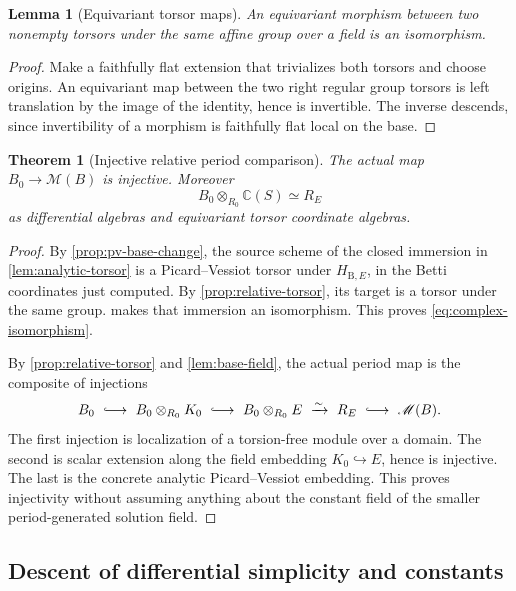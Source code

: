 \documentclass[11pt]{article}
\numberwithin{equation}{section}
\newtheorem{theorem}{Theorem}[section]
\newtheorem{lemma}[lemma]{Lemma}
\theoremstyle{definition}
\theoremstyle{remark}
\newcommand{\C}{\mathbb C}
\newcommand{\B}{\mathrm B}
\begin{document}
\begin{lemma}[Equivariant torsor maps]\label{lem:torsor-iso}\label{lem:torsor-map}
An equivariant morphism between two nonempty torsors under the same affine
group over a field is an isomorphism.
\end{lemma}
\begin{proof}
Make a faithfully flat extension that trivializes both torsors and choose
origins. An equivariant map between the two right regular group torsors
is left translation by the image of the identity, hence is invertible.
The inverse descends, since invertibility of a morphism is faithfully
flat local on the base.
\end{proof}

\begin{theorem}[Injective relative period comparison]\label{thm:period-injective}
The actual map $B_0\to\mathscr M(B)$ is injective. Moreover
\begin{equation}\label{eq:complex-isomorphism}
 B_0\otimes_{R_0}\C(S)\simeq R_E
\end{equation}
as differential algebras and equivariant torsor coordinate algebras.
\end{theorem}
\begin{proof}
By \cref{prop:pv-base-change}, the source scheme of the closed immersion
in \cref{lem:analytic-torsor} is a Picard--Vessiot torsor under
$H_{\B,E}$, in the Betti coordinates just computed. By
\cref{prop:relative-torsor}, its target is a torsor under the same group.
 makes that immersion an isomorphism. This proves
\eqref{eq:complex-isomorphism}.

By \cref{prop:relative-torsor} and \cref{lem:base-field}, the actual
period map is the composite of injections
\[
 B_0\ \lhook\joinrel\longrightarrow\ B_0\otimes_{R_0}K_0
 \ \lhook\joinrel\longrightarrow\ B_0\otimes_{R_0}E
 \ \xrightarrow{\sim}\ R_E
 \ \lhook\joinrel\longrightarrow\ \mathscr M(B).
\]
The first injection is localization of a torsion-free module over a
domain. The second is scalar extension along the field embedding
$K_0\hookrightarrow E$, hence is injective. The last is the concrete
analytic Picard--Vessiot embedding. This proves injectivity without
assuming anything about the constant field of the smaller period-generated
solution field.
\end{proof}

\subsection{Descent of differential simplicity and constants}
\end{document}
